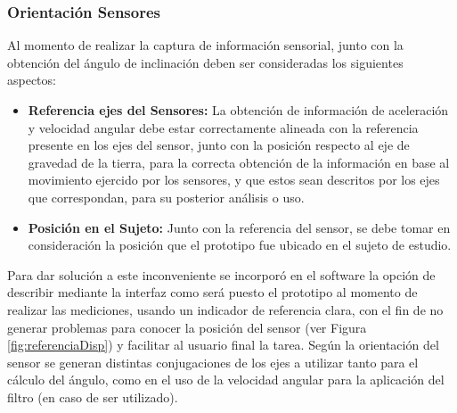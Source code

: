 \documentclass[12pt,a4paper]{article}
\begin{document}
\newpage
\subsubsection{Orientación Sensores}
Al momento de realizar la captura de información sensorial, junto con la obtención del ángulo de inclinación deben ser consideradas los siguientes aspectos:
\begin{itemize}
	
	\item \textbf{Referencia ejes del Sensores:} La obtención de información de aceleración y velocidad angular debe estar correctamente alineada con la referencia presente en los ejes del sensor, junto con la posición respecto al eje de gravedad de la tierra, para la correcta obtención de la información en base al movimiento ejercido por los sensores, y que estos sean descritos por los ejes que correspondan, para su posterior análisis o uso.
	
	\item \textbf{Posición en el Sujeto:} Junto con la referencia del sensor, se debe tomar en consideración  la posición que el prototipo fue ubicado en el sujeto de estudio.
\end{itemize}

Para dar solución a este inconveniente se incorporó en el software la opción de describir mediante la interfaz como será puesto el prototipo al momento de realizar las mediciones, usando un indicador de referencia clara, con el fin de no generar problemas para conocer la posición del sensor (ver Figura \ref{fig:referenciaDisp}) y facilitar al usuario final la tarea.
Según la orientación del sensor se generan distintas conjugaciones de los ejes a utilizar tanto para el cálculo del ángulo, como en el uso de la velocidad angular para la aplicación del filtro (en caso de ser utilizado).
\end{document}

